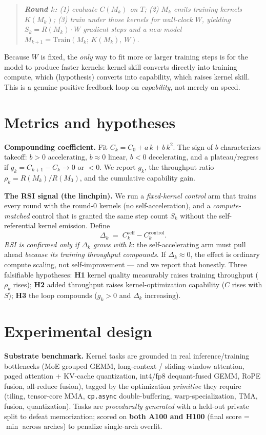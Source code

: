 \documentclass[10pt]{article}
\begin{document}
\begin{quote}\itshape
\textbf{Round $k$:} (1) evaluate $C(M_k)$ on $T$; (2) $M_k$ emits training kernels
$K(M_k)$; (3) train under those kernels for wall-clock $W$, yielding
$S_k = R(M_k)\cdot W$ gradient steps and a new model
$M_{k+1} = \mathrm{Train}(M_k;\,K(M_k),\,W)$.
\end{quote}

Because $W$ is fixed, the \emph{only} way to fit more or larger training steps is for
the model to produce faster kernels: kernel skill converts directly into training
compute, which (hypothesis) converts into capability, which raises kernel skill. This
is a genuine positive feedback loop on \emph{capability}, not merely on speed.

\section{Metrics and hypotheses}
\textbf{Compounding coefficient.} Fit $C_k = C_0 + a\,k + b\,k^2$. The sign of $b$
characterizes takeoff: $b>0$ accelerating, $b\approx0$ linear, $b<0$ decelerating,
and a plateau/regress if $g_k = C_{k+1}-C_k \to 0$ or $<0$. We report $g_k$, the
throughput ratio $\rho_k = R(M_k)/R(M_0)$, and the cumulative capability gain.

\textbf{The RSI signal (the linchpin).} We run a \emph{fixed-kernel control} arm that
trains every round with the round-0 kernels (no self-acceleration), and a
\emph{compute-matched} control that is granted the same step count $S_k$ without the
self-referential kernel emission. Define
\[
\Delta_k \;=\; C_k^{\text{self}} - C_k^{\text{control}} .
\]
\emph{RSI is confirmed only if $\Delta_k$ grows with $k$}: the self-accelerating arm
must pull ahead \emph{because its training throughput compounds}. If $\Delta_k\approx0$,
the effect is ordinary compute scaling, not self-improvement --- and we report that
honestly. Three falsifiable hypotheses: \textbf{H1} kernel quality measurably raises
training throughput ($\rho_k$ rises); \textbf{H2} added throughput raises
kernel-optimization capability ($C$ rises with $S$); \textbf{H3} the loop compounds
($g_k>0$ and $\Delta_k$ increasing).

\section{Experimental design}
\textbf{Substrate benchmark.} Kernel tasks are grounded in real inference/training
bottlenecks (MoE grouped GEMM, long-context / sliding-window attention, paged
attention + KV-cache quantization, int4/fp8 dequant-fused GEMM, RoPE fusion,
all-reduce fusion), tagged by the optimization \emph{primitive} they require (tiling,
tensor-core MMA, \texttt{cp.async} double-buffering, warp-specialization, TMA,
fusion, quantization). Tasks are \emph{procedurally generated} with a held-out private
split to defeat memorization; scored on \textbf{both A100 and H100} (final score =
$\min$ across arches) to penalize single-arch overfit.
\end{document}
